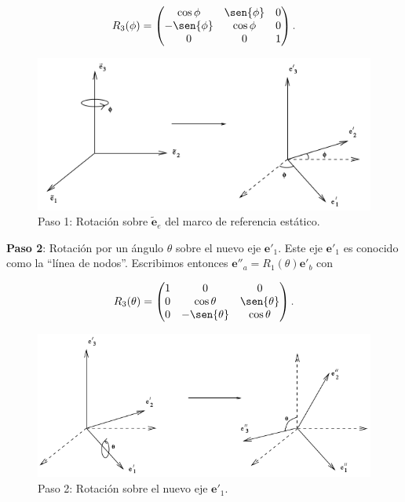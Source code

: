 \documentclass[a4paper,10pt]{article}
\numberwithin{equation}{section}
\begin{document}
\begin{equation}
 R_3(\phi) = \begin{pmatrix}
              \cos{\phi} & \sen{\phi} & 0 \\
	      -\sen{\phi} & \cos{\phi} & 0 \\
	      0 & 0 & 1
	     \end{pmatrix}.
\end{equation}

\begin{figure}[H]
  \center 
  \includegraphics[scale=0.6]{problema5fig2}
  \caption{Paso 1: Rotación sobre $\tilde{\mathbf{e}}_e$ del marco de referencia 
  estático.}
\end{figure}

\textbf{Paso 2}: Rotación por un ángulo $\theta$ sobre el nuevo eje $\mathbf{e}'_1$. 
Este eje $\mathbf{e}'_1$ es conocido como la ``línea de nodos''. Escribimos entonces 
$\mathbf{e}''_a = R_1(\theta)\mathbf{e}'_b$ con 

\begin{equation}
 R_3(\theta) = \begin{pmatrix}
              1 & 0 & 0 \\
	      0 & \cos{\theta} & \sen{\theta} \\
	      0 & -\sen{\theta} & \cos{\theta}
	     \end{pmatrix}.
\end{equation}

\begin{figure}[H]
  \center 
  \includegraphics[scale=0.6]{problema5fig3}
  \caption{Paso 2: Rotación sobre el nuevo eje $\mathbf{e}'_1$.}
\end{figure}
\end{document}
